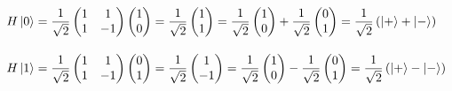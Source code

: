 \documentclass{article}
\numberwithin{equation}{section} %
\begin{document}
    \begin{align*}
        & H \ket{0} = \frac{1}{\sqrt{2}} \begin{pmatrix}
            1 & 1 \\
            1 & -1
        \end{pmatrix} \begin{pmatrix}
            1 \\
            0
        \end{pmatrix} = \frac{1}{\sqrt{2}} \begin{pmatrix}
            1 \\
            1
        \end{pmatrix} = \frac{1}{\sqrt{2}} \begin{pmatrix}
            1 \\
            0
        \end{pmatrix} + \frac{1}{\sqrt{2}} \begin{pmatrix}
            0 \\
            1
        \end{pmatrix} = \frac{1}{\sqrt{2}} \left( \ket{+} + \ket{-} \right) \\[10pt]
        & H \ket{1} = \frac{1}{\sqrt{2}} \begin{pmatrix}
            1 & 1 \\
            1 & -1
        \end{pmatrix} \begin{pmatrix}
            0 \\
            1
        \end{pmatrix} = \frac{1}{\sqrt{2}} \begin{pmatrix}
            1 \\
            -1
        \end{pmatrix} = \frac{1}{\sqrt{2}} \begin{pmatrix}
            1 \\
            0
        \end{pmatrix} - \frac{1}{\sqrt{2}} \begin{pmatrix}
            0 \\
            1
        \end{pmatrix} = \frac{1}{\sqrt{2}} \left( \ket{+} - \ket{-} \right)
    \end{align*}

    \vspace{2.5mm}
\end{document}
